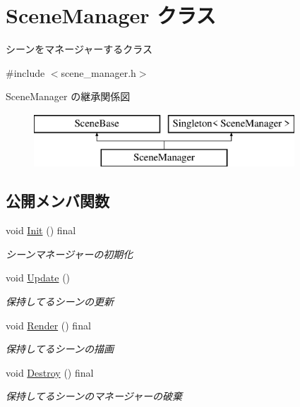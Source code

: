 \hypertarget{class_scene_manager}{}\section{Scene\+Manager クラス}
\label{class_scene_manager}


シーンをマネージャーするクラス  




{\ttfamily \#include $<$scene\+\_\+manager.\+h$>$}

Scene\+Manager の継承関係図\begin{figure}[H]
\begin{center}
\leavevmode
\includegraphics[height=2.000000cm]{class_scene_manager}
\end{center}
\end{figure}
\subsection*{公開メンバ関数}
\begin{DoxyCompactItemize}
\item 
void \mbox{\hyperlink{class_scene_manager_a6c0e84d0e76f23fb3172839dba5f091b}{Init}} () final
\begin{DoxyCompactList}\small\item\em シーンマネージャーの初期化 \end{DoxyCompactList}\item 
void \mbox{\hyperlink{class_scene_manager_a63dcf65832d6a2c190bf496d9a3b00a3}{Update}} ()
\begin{DoxyCompactList}\small\item\em 保持してるシーンの更新 \end{DoxyCompactList}\item 
void \mbox{\hyperlink{class_scene_manager_a968ae7a0065b793f139bda6bcc58d106}{Render}} () final
\begin{DoxyCompactList}\small\item\em 保持してるシーンの描画 \end{DoxyCompactList}\item 
void \mbox{\hyperlink{class_scene_manager_a0e3ad11342e763f0d4108c0b4674a157}{Destroy}} () final
\begin{DoxyCompactList}\small\item\em 保持してるシーンのマネージャーの破棄 \end{DoxyCompactList}\end{DoxyCompactItemize}
